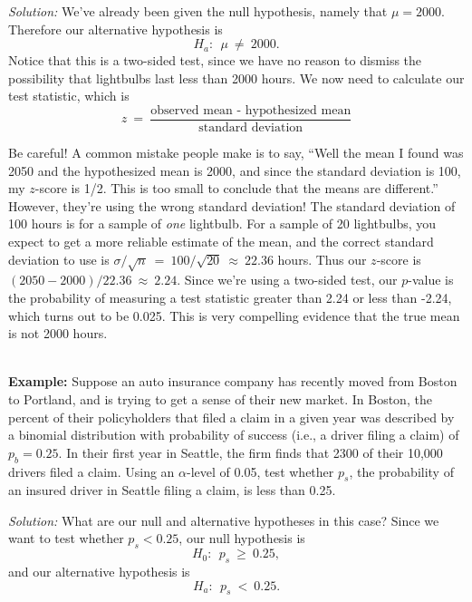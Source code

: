 \emph{Solution:}  We've already been given the null hypothesis, namely that $\mu = 2000$.  Therefore our alternative hypothesis is
\begin{equation*}
H_a:\ \ \mu\ \neq \ 2000.
\end{equation*}
Notice that this is a two-sided test, since we have no reason to dismiss the possibility that lightbulbs last less than 2000 hours.  We now need to calculate our test statistic, which is
\begin{equation*}
z\ = \ \frac{\textrm{observed mean - hypothesized mean}}{\textrm{standard deviation}}
\end{equation*}

Be careful!  A common mistake people make is to say, ``Well the mean I found was 2050 and the hypothesized mean is 2000, and since the standard deviation is 100, my $z$-score is 1/2.  This is too small to conclude that the means are different.'' However, they're using the wrong standard deviation! The standard deviation of 100 hours is for a sample of \emph{one} lightbulb. For a sample of 20 lightbulbs, you expect to get a more reliable estimate of the mean, and the correct standard deviation to use is $\sigma/\sqrt{n}\ = \ 100/\sqrt{20}\ \approx \ 22.36$ hours. Thus our $z$-score is $\left(2050-2000\right)/22.36\ \approx \ 2.24$.  Since we're using a two-sided test, our $p$-value is the probability of measuring a test statistic greater than 2.24 or less than -2.24, which turns out to be 0.025.  This is very compelling evidence that the true mean is not 2000 hours.

\ \\

\textbf{Example:} \ex Suppose an auto insurance company has recently moved from Boston to Portland, and is trying to get a sense of their new market.  In Boston, the percent of their policyholders that filed a claim in a given year was described by a binomial distribution with probability of success (i.e., a driver filing a claim) of $p_b=0.25$.  In their first year in Seattle, the firm finds that 2300 of their 10,000 drivers filed a claim.  Using an $\alpha$-level of 0.05, test whether $p_s$, the probability of an insured driver in Seattle filing a claim, is less than 0.25.

\emph{Solution:} What are our null and alternative hypotheses in this case?  Since we want to test whether $p_s<0.25$, our null hypothesis is
\begin{equation*}
H_0:\ \  p_s\ \geq\ 0.25,
\end{equation*}
and our alternative hypothesis is
\begin{equation*}
H_a:\ \ p_s\ <\ 0.25.
\end{equation*}

